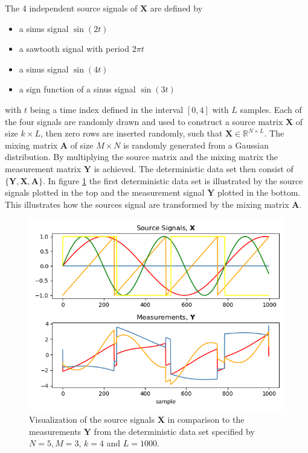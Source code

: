The 4 independent source signals of $\mathbf{X}$ are defined by 
\begin{itemize}
\item[1.] a sinus signal $\sin(2t)$
\item[2.] a sawtooth signal with period $2 \pi t$
\item[3.] a sinus signal $\sin(4t)$
\item[4.] a sign function of a sinus signal $\sin(3t)$
\end{itemize}
with $t$ being a time index defined in the interval $[0,4]$ with $L$ samples. Each of the four signals are randomly drawn and used to construct a source matrix $\mathbf{X}$ of size $k \times L$, then zero rows are inserted randomly, such that $\mathbf{X} \in \mathbb{R}^{N \times L}$. 
The mixing matrix $\mathbf{A}$ of size $M \times N$ is randomly generated from a Gaussian distribution. 
By multiplying the source matrix and the mixing matrix the measurement matrix $\mathbf{Y}$ is achieved.
The deterministic data set then consist of $\{ \mathbf{Y}, \mathbf{X}, \mathbf{A} \}$.
In figure \ref{fig:simple} the first deterministic data set is illustrated by the source signals plotted in the top and the measurement signal $\mathbf{Y}$ plotted in the bottom. This illustrates how the sources signal are transformed by the mixing matrix $\mathbf{A}$.
\begin{figure}[H]
\centering
\includegraphics[scale=0.5]{figures/ch_6/simple_data.png}
\caption{Visualization of the source signals $\mathbf{X}$ in comparison to the measurements $\mathbf{Y}$ from the deterministic data set specified by $N = 5, M = 3$, $k = 4$ and $L=1000$.}
\label{fig:simple}
\end{figure}
\noindent

